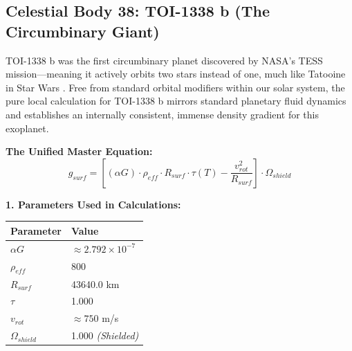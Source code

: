 \documentclass[11pt, a4paper]{article}
\begin{document}
\clearpage
\subsection{Celestial Body 38: TOI-1338 b (The Circumbinary Giant)}
  TOI-1338 b was the first circumbinary planet discovered by NASA's TESS mission—meaning it actively orbits two stars instead of one, much like Tatooine in Star Wars \cite{kostov2020}. Free from standard orbital modifiers within our solar system, the pure local calculation for TOI-1338 b mirrors standard planetary fluid dynamics and establishes an internally consistent, immense density gradient for this exoplanet.

  \vspace{0.5em}
  \noindent \textbf{The Unified Master Equation:}
  $$ g_{surf} = \left[ (\alpha G) \cdot \rho_{eff} \cdot R_{surf} \cdot \tau(T) - \frac{v_{rot}^2}{R_{surf}} \right] \cdot \Omega_{shield} $$

  \vspace{0.5em}
  \noindent \textbf{1. Parameters Used in Calculations:} \\[0.5em]
  \begingroup
  \renewcommand{\arraystretch}{1.3}
  \hspace*{2em}
  \begin{tabular}{|l|l|}
    \hline
    \textbf{Parameter} & \textbf{Value} \\ \hline
    $\alpha G$ & $\approx 2.792 \times 10^{-7}$ \\ \hline
    $\rho_{eff}$ & 800 \\ \hline
    $R_{surf}$ & 43640.0 km \\ \hline
    $\tau$ & 1.000 \\ \hline
    $v_{rot}$ & $\approx 750$ m/s \\ \hline
    $\Omega_{shield}$ & 1.000 \textit{(Shielded)} \\ \hline
  \end{tabular}
  \endgroup
\end{document}
